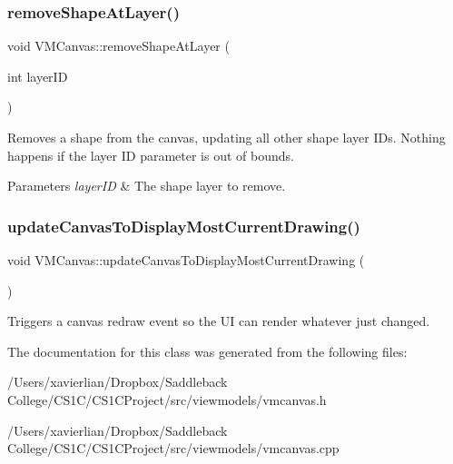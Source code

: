 \subsubsection{\texorpdfstring{removeShapeAtLayer()}{removeShapeAtLayer()}}
{\footnotesize\ttfamily void V\+M\+Canvas\+::remove\+Shape\+At\+Layer (\begin{DoxyParamCaption}\item[{int}]{layer\+ID }\end{DoxyParamCaption})}



Removes a shape from the canvas, updating all other shape layer I\+Ds. Nothing happens if the layer ID parameter is out of bounds. 


\begin{DoxyParams}{Parameters}
{\em layer\+ID} & The shape layer to remove. \\
\hline
\end{DoxyParams}
\mbox{\label{class_v_m_canvas_a66bc48cf35def60c67cb5ba06d31f2a8}} 
\subsubsection{\texorpdfstring{updateCanvasToDisplayMostCurrentDrawing()}{updateCanvasToDisplayMostCurrentDrawing()}}
{\footnotesize\ttfamily void V\+M\+Canvas\+::update\+Canvas\+To\+Display\+Most\+Current\+Drawing (\begin{DoxyParamCaption}{ }\end{DoxyParamCaption})}



Triggers a canvas redraw event so the UI can render whatever just changed. 



The documentation for this class was generated from the following files\+:\begin{DoxyCompactItemize}
\item 
/\+Users/xavierlian/\+Dropbox/\+Saddleback College/\+C\+S1\+C/\+C\+S1\+C\+Project/src/viewmodels/vmcanvas.\+h\item 
/\+Users/xavierlian/\+Dropbox/\+Saddleback College/\+C\+S1\+C/\+C\+S1\+C\+Project/src/viewmodels/vmcanvas.\+cpp\end{DoxyCompactItemize}
